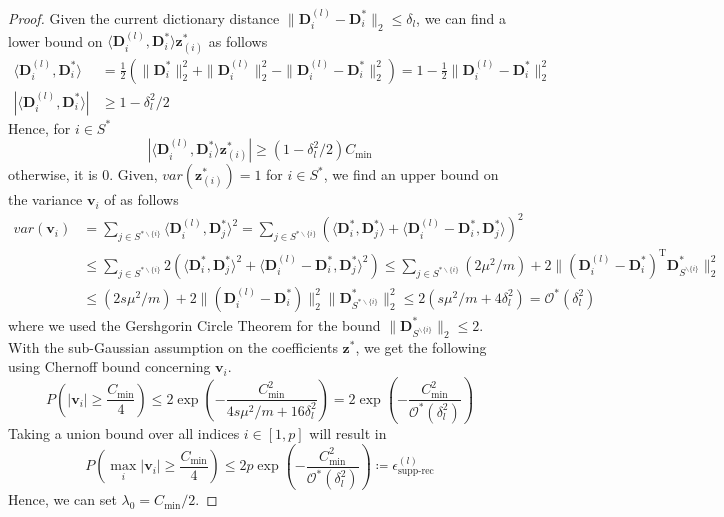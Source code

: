 \documentclass[10pt]{article} %
\newcommand{\D}{{\bm D}}
\newcommand{\z}{{\bm z}}
\newcommand{\vvec}{{\bm v}}
\begin{document}
\begin{proof}
Given the current dictionary distance $\| \D^{(l)}_i - \D_i^{\ast} \|_2 \leq \delta_l$, we can find a lower bound on $\langle \D^{(l)}_i, \D^{\ast}_i \rangle  \z^{\ast}_{(i)}$ as follows
\begin{equation}
\begin{aligned}
\langle \D_i^{(l)}, \D_i^{\ast} \rangle &=  \frac{1}{2} (\| \D_i^{\ast} \|_2^2 + \| \D_i^{(l)} \|_2^2 -\| \D_i^{(l)} - \D_i^{\ast} \|_2^2) = 1 - \frac{1}{2} \| \D_i^{(l)} - \D_i^{\ast} \|_2^2\\
| \langle \D_i^{(l)}, \D_i^{\ast} \rangle | &\geq 1 - \delta_l^2 / 2
\end{aligned} 
\end{equation}
Hence, for $i \in S^{\ast}$
\begin{equation}
| \langle \D^{(l)}_i , \D^{\ast}_i \rangle  \z^{\ast}_{(i)} | \geq (1 - \delta_l^2 / 2) C_{\min}
\end{equation}
otherwise, it is $0$. Given, $var(\z^{\ast}_{(i)}) = 1$ for $i \in S^{\ast}$, we find an upper bound on the variance $\vvec_i$ of as follows
\begin{equation}
\begin{aligned}
var(\vvec_i) &= \sum_{j \in S^{\ast \backslash \{i\}}} \langle \D^{(l)}_i, \D^{\ast}_j \rangle^2
=  \sum_{j \in S^{\ast \backslash \{i\}}} (\langle \D^{\ast}_i, \D^{\ast}_j \rangle + \langle \D^{(l)}_i - \D^{\ast}_i, \D^{\ast}_j \rangle )^2\\
&\leq \sum_{j \in S^{\ast \backslash \{i\}}} 2(\langle \D^{\ast}_i, \D^{\ast}_j \rangle^2 + \langle \D^{(l)}_i - \D^{\ast}_i, \D^{\ast}_j \rangle^2)
\leq \sum_{j \in S^{\ast \backslash \{i\}}} (2\mu^2/m) + 2\| (\D^{(l)}_i - \D^{\ast}_i)^{\text{T}} \D^{\ast}_{S^{\backslash \{i\}}} \|_2^2\\
&\leq (2s\mu^2/m) + 2\| (\D^{(l)}_i - \D^{\ast}_i)\|_2^2  \| \D^{\ast}_{S^{\ast \backslash \{i\}}} \|_2^2
\leq 2(s\mu^2/m + 4\delta_l^2) = \mathcal{O}^{\ast}(\delta_l^2)
\end{aligned}
\end{equation}
where we used the Gershgorin Circle Theorem for the bound $\| \D^{\ast}_{S^{\backslash \{i\}}} \|_2 \leq 2$. With the sub-Gaussian assumption on the coefficients $\z^{\ast}$, we get the following using Chernoff bound concerning $\vvec_i$.
\begin{equation}
P( | \vvec_i | \geq \frac{C_{\min}}{4}) \leq 2 \exp{(- \frac{C_{\min}^2}{4s\mu^2/m + 16\delta_l^2})} = 2 \exp{(- \frac{C_{\min}^2}{\mathcal{O}^{\ast}(\delta_l^2)})}
\end{equation}
Taking a union bound over all indices $i \in [1, p]$ will result in
\begin{equation}
P( \max_{i} | \vvec_i | \geq \frac{C_{\min}}{4}) \leq 2 p\exp{(- \frac{C_{\min}^2}{\mathcal{O}^{\ast}(\delta_l^2)})} \coloneqq \epsilon^{(l)}_{\text{supp-rec}}
\end{equation}
Hence, we can set $\lambda_0 = C_{\min} / 2$.
\end{proof}
\end{document}
